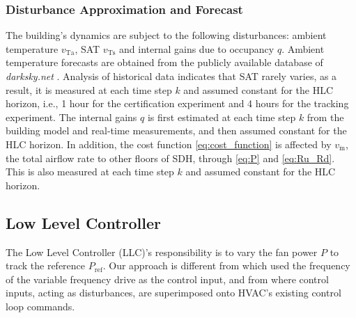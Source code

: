 \subsubsection{Disturbance Approximation and Forecast}
The building's dynamics are subject to the following disturbances: ambient temperature $v_{\text{Ta}}$, SAT $v_{\text{Ts}}$ and internal gains due to occupancy $q$. 
Ambient temperature forecasts are obtained from the publicly available database of \textit{darksky.net} \cite{darksky}. 
Analysis of historical data indicates that SAT rarely varies, as a result, it is measured at each time step $k$ and assumed constant for the HLC horizon, i.e., 1 hour for the certification experiment and 4 hours for the tracking experiment.
The internal gains $q$ is first estimated at each time step $k$ from the building model and real-time measurements, and then assumed constant for the HLC horizon.
In addition, the cost function \eqref{eq:cost_function} is affected by $v_{\dot{\text{m}}}$, the total airflow rate to other floors of SDH, through \eqref{eq:P} and \eqref{eq:Ru_Rd}. This is also measured at each time step $k$ and assumed constant for the HLC horizon.






\subsection{Low Level Controller}\label{sec:llc}

The Low Level Controller (LLC)'s responsibility is to vary the fan power $P$ to track the reference $P_{\text{ref}}$. 
Our approach is different from \cite{Macdonald:2014pjm} which used the frequency of the variable frequency drive as the control input, and from \cite{Lin:2015exp} where control inputs, acting as disturbances, are superimposed onto HVAC's existing control loop commands.

